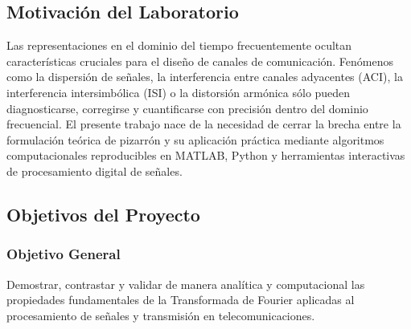 \documentclass[11pt,a4paper]{article}
\begin{document}
\subsection{Motivaci\'on del Laboratorio}
Las representaciones en el dominio del tiempo frecuentemente ocultan caracter\'isticas cruciales para el dise\~no de canales de comunicaci\'on. Fen\'omenos como la dispersi\'on de se\~nales, la interferencia entre canales adyacentes (ACI), la interferencia intersimb\'olica (ISI) o la distorsi\'on arm\'onica s\'olo pueden diagnosticarse, corregirse y cuantificarse con precisi\'on dentro del dominio frecuencial. El presente trabajo nace de la necesidad de cerrar la brecha entre la formulaci\'on te\'orica de pizarr\'on y su aplicaci\'on pr\'actica mediante algoritmos computacionales reproducibles en MATLAB, Python y herramientas interactivas de procesamiento digital de se\~nales.

\subsection{Objetivos del Proyecto}

\subsubsection{Objetivo General}
Demostrar, contrastar y validar de manera anal\'itica y computacional las propiedades fundamentales de la Transformada de Fourier aplicadas al procesamiento de se\~nales y transmisi\'on en telecomunicaciones.
\end{document}
